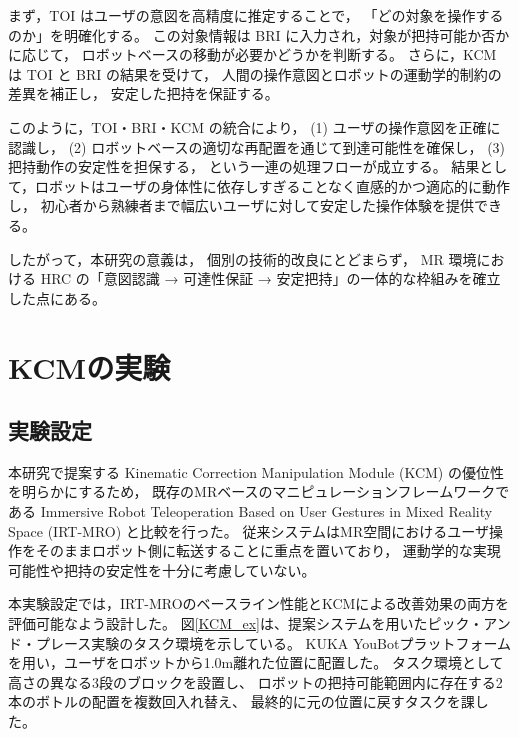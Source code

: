 \documentclass[../../main.tex]{subfiles} %
\begin{document}
まず，TOI はユーザの意図を高精度に推定することで，
「どの対象を操作するのか」を明確化する。
この対象情報は BRI に入力され，対象が把持可能か否かに応じて，
ロボットベースの移動が必要かどうかを判断する。
さらに，KCM は TOI と BRI の結果を受けて，
人間の操作意図とロボットの運動学的制約の差異を補正し，
安定した把持を保証する。

このように，TOI・BRI・KCM の統合により，
(1) ユーザの操作意図を正確に認識し，
(2) ロボットベースの適切な再配置を通じて到達可能性を確保し，
(3) 把持動作の安定性を担保する，
という一連の処理フローが成立する。
結果として，ロボットはユーザの身体性に依存しすぎることなく直感的かつ適応的に動作し，
初心者から熟練者まで幅広いユーザに対して安定した操作体験を提供できる。

したがって，本研究の意義は，
個別の技術的改良にとどまらず，
MR 環境における HRC の「意図認識 → 可達性保証 → 安定把持」の一体的な枠組みを確立した点にある。


\section{KCMの実験}
\subsection{実験設定}
本研究で提案する Kinematic Correction Manipulation Module (KCM) の優位性を明らかにするため，
既存のMRベースのマニピュレーションフレームワークである 
Immersive Robot Teleoperation Based on User Gestures in Mixed Reality Space (IRT-MRO) \cite{Esaki} と比較を行った。
従来システムはMR空間におけるユーザ操作をそのままロボット側に転送することに重点を置いており，
運動学的な実現可能性や把持の安定性を十分に考慮していない。




本実験設定では，IRT-MROのベースライン性能とKCMによる改善効果の両方を評価可能なよう設計した。
図\ref{KCM_ex}は、提案システムを用いたピック・アンド・プレース実験のタスク環境を示している。
KUKA YouBotプラットフォームを用い，ユーザをロボットから1.0m離れた位置に配置した。
タスク環境として高さの異なる3段のブロックを設置し、
ロボットの把持可能範囲内に存在する2本のボトルの配置を複数回入れ替え、
最終的に元の位置に戻すタスクを課した。
\end{document}
